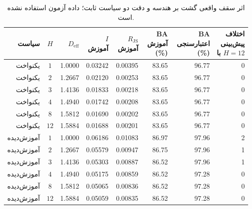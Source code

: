\begin{table}[htbp]
\centering\scriptsize
\caption{اثر سقف واقعی گشت بر هندسه و دقت دو سیاست ثابت؛ داده آزمون استفاده نشده است.}
\label{tab:ch4-e09-depth-main}
\begin{tabular}{rcrrrrrr}\hline
سیاست & $H$ & $D_{\mathrm{eff}}$ & $I$ آموزش & $R_{\mathrm{JS}}$ آموزش & BA آموزش (\%) & BA اعتبارسنجی (\%) & اختلاف پیش‌بینی با $H=12$\\\hline
یکنواخت & $1$ & 1.0000 & 0.03242 & 0.00395 & 83.65 & 96.77 & 0\\
یکنواخت & $2$ & 1.2667 & 0.02120 & 0.00253 & 83.65 & 96.77 & 0\\
یکنواخت & $3$ & 1.4136 & 0.01833 & 0.00218 & 83.65 & 96.77 & 0\\
یکنواخت & $4$ & 1.4940 & 0.01742 & 0.00208 & 83.65 & 96.77 & 0\\
یکنواخت & $8$ & 1.5812 & 0.01690 & 0.00202 & 83.65 & 96.77 & 0\\
یکنواخت & $12$ & 1.5884 & 0.01688 & 0.00201 & 83.65 & 96.77 & 0\\
\hline
آموزش‌دیده & $1$ & 1.0000 & 0.06186 & 0.01083 & 86.97 & 97.96 & 2\\
آموزش‌دیده & $2$ & 1.2667 & 0.05579 & 0.00947 & 86.75 & 97.96 & 1\\
آموزش‌دیده & $3$ & 1.4136 & 0.05303 & 0.00887 & 86.52 & 97.96 & 1\\
آموزش‌دیده & $4$ & 1.4940 & 0.05175 & 0.00859 & 86.52 & 97.28 & 0\\
آموزش‌دیده & $8$ & 1.5812 & 0.05065 & 0.00836 & 86.52 & 97.28 & 0\\
آموزش‌دیده & $12$ & 1.5884 & 0.05059 & 0.00835 & 86.52 & 97.28 & 0\\
\hline
\end{tabular}
\end{table}
